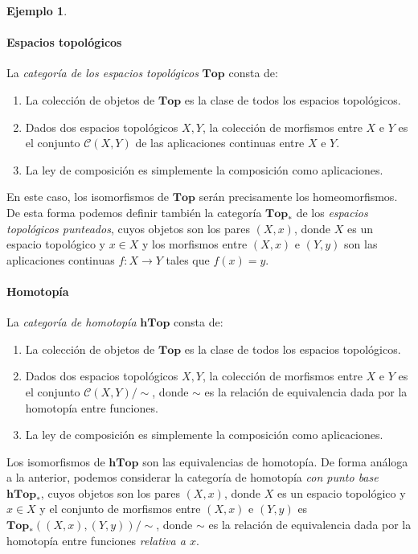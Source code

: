 \documentclass[12pt,a4paper]{book}
\theoremstyle{definition} \newtheorem{defn}[thm]{Definición}
\theoremstyle{definition} \newtheorem{ejemplo}[thm]{Ejemplo}
\theoremstyle{definition} \newtheorem{ejercicio}[thm]{Ejercicio}
\theoremstyle{remark} \newtheorem*{obs}{Observación}
\def\top{\mathbf{Top}}
\def\htop{\mathbf{hTop}}
\begin{document}
\begin{ejemplo}
  \paragraph{Espacios topológicos} La \emph{categoría de los espacios topológicos} $\top$ consta de:
  \begin{enumerate}
    \item La colección de objetos de $\top$ es la clase de todos los espacios topológicos.
    \item Dados dos espacios topológicos $X, Y$, la colección de morfismos entre $X$ e $Y$ es el conjunto $\mathcal{C}(X,Y)$ de las aplicaciones continuas entre $X$ e $Y$.
    \item La ley de composición es simplemente la composición como aplicaciones.
  \end{enumerate}
  En este caso, los isomorfismos de $\top$ serán precisamente los homeomorfismos. De esta forma podemos definir también la categoría $\top_*$ de los \emph{espacios topológicos punteados}, cuyos objetos son los pares $(X,x)$, donde $X$ es un espacio topológico y $x\in X$ y los morfismos entre $(X,x)$ e $(Y,y)$ son las aplicaciones continuas $f:X\rightarrow Y$ tales que $f(x)=y$.

  \paragraph{Homotopía} La \emph{categoría de homotopía} $\htop$ consta de:
  \begin{enumerate}
    \item La colección de objetos de $\top$ es la clase de todos los espacios topológicos.
    \item Dados dos espacios topológicos $X, Y$, la colección de morfismos entre $X$ e $Y$ es el conjunto $\mathcal{C}(X,Y)/\sim$, donde $\sim$ es la relación de equivalencia dada por la homotopía entre funciones.
    \item La ley de composición es simplemente la composición como aplicaciones.
  \end{enumerate}
  Los isomorfismos de $\htop$ son las equivalencias de homotopía. De forma análoga a la anterior, podemos considerar la categoría de homotopía \emph{con punto base} $\htop_*$, cuyos objetos son los pares $(X,x)$, donde $X$ es un espacio topológico y $x\in X$ y el conjunto de morfismos entre $(X,x)$ e $(Y,y)$ es $\top_*( (X,x) ,(Y,y) )/\sim$, donde $\sim$ es la relación de equivalencia dada por la homotopía entre funciones \emph{relativa a $x$}.


\end{ejemplo}
\end{document}
